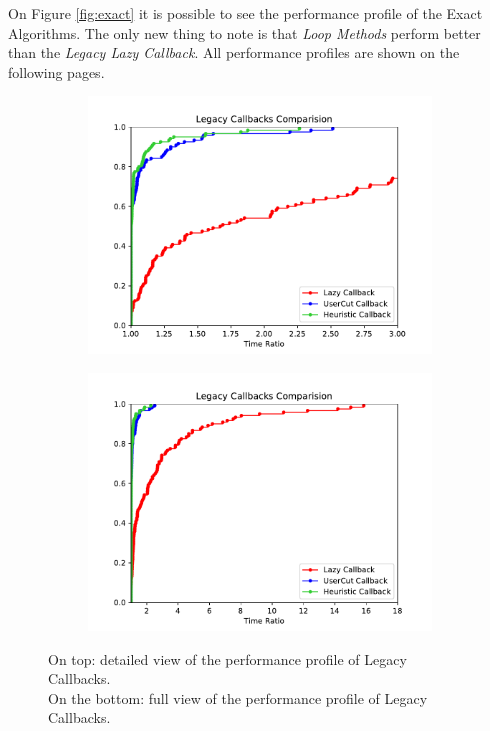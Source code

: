 On Figure \ref{fig:exact} it is possible to see the performance profile of the Exact Algorithms. The only new thing to note is that \textit{Loop Methods} perform better than the \textit{Legacy Lazy Callback}.
All performance profiles are shown on the following pages.

\begin{figure}[h!]
  \centering
  \begin{subfigure}[b]{0.97\linewidth}
    \includegraphics[width=\linewidth]{media/LegacyCallbacks.pdf}
  \end{subfigure}
  \begin{subfigure}[b]{0.97\linewidth}
  \ContinuedFloat
    \includegraphics[width=\linewidth]{media/LegacyCallbacks1.pdf}
  \end{subfigure}
  \caption{On top: detailed view of the performance profile of Legacy Callbacks. \\On the bottom: full view of the performance profile of Legacy Callbacks.}
\label{fig:lazy}
\end{figure}

